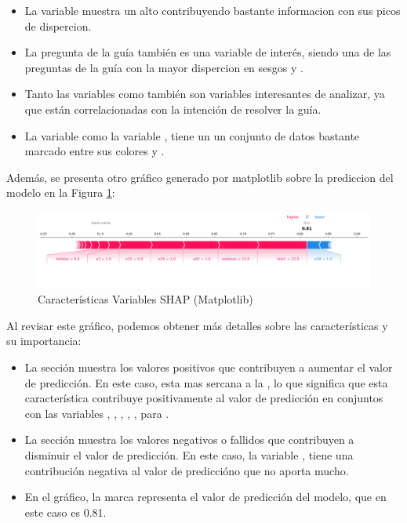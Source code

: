 \begin{itemize}
    \item La variable   muestra un alto  contribuyendo bastante informacion con sus picos de dispercion.
    \item La pregunta de la guía  también es una variable de interés, siendo una de las preguntas de la guía con la mayor dispercion en sesgos  y .
    \item Tanto las variables  como  también son variables interesantes de analizar, ya que están correlacionadas con la intención de resolver la guía.
    \item La variable  como la variable , tiene un un conjunto de datos bastante marcado entre  sus colores  y .
\end{itemize}

Además, se presenta otro gráfico generado por matplotlib sobre la prediccion del modelo en la Figura \ref{fig:caract_var_shap_mat}:

\begin{figure}[H]
    \centering
    \includegraphics[width=1\textwidth]{img/shap_rf/shapForcePlot.png}
    \caption{Características Variables SHAP (Matplotlib)}
    \label{fig:caract_var_shap_mat}
\end{figure}

Al revisar este gráfico, podemos obtener más detalles sobre las características y su importancia:

\begin{itemize}
    \item La sección  muestra los valores positivos que contribuyen a aumentar el valor de predicción. En este caso,  esta mas sercana a la , lo que significa que esta característica contribuye positivamente al valor de predicción en conjuntos con las variables , , , , ,  para .
    \item La sección  muestra los valores negativos o fallidos que contribuyen a disminuir el valor de predicción. En este caso, la variable , tiene una contribución negativa al valor de prediccióno que no aporta mucho.
    \item En el gráfico, la marca  representa el valor de predicción del modelo, que en este caso es 0.81.
\end{itemize}

